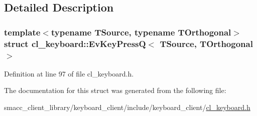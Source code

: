 \subsection{Detailed Description}
\subsubsection*{template$<$typename T\+Source, typename T\+Orthogonal$>$\newline
struct cl\+\_\+keyboard\+::\+Ev\+Key\+Press\+Q$<$ T\+Source, T\+Orthogonal $>$}



Definition at line 97 of file cl\+\_\+keyboard.\+h.



The documentation for this struct was generated from the following file\+:\begin{DoxyCompactItemize}
\item 
smacc\+\_\+client\+\_\+library/keyboard\+\_\+client/include/keyboard\+\_\+client/\hyperlink{cl__keyboard_8h}{cl\+\_\+keyboard.\+h}\end{DoxyCompactItemize}
